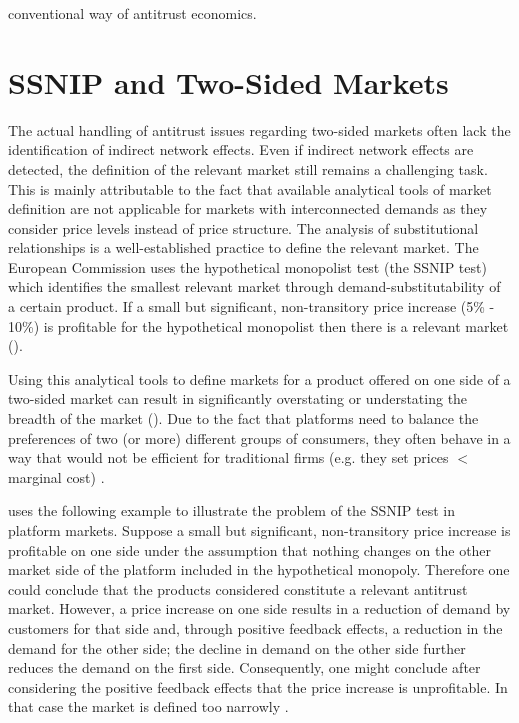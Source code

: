 \documentclass[10pt,a4paper]{scrreprt}
\begin{document}
conventional way of antitrust economics. 


\chapter{SSNIP and Two-Sided Markets}\label{SSNIP}

The actual handling of antitrust issues regarding two-sided markets often lack the identification of indirect network effects. Even if indirect network effects are detected, the definition of the relevant market still remains a challenging task. This is mainly attributable to the fact that available analytical tools of market definition are not applicable for markets with interconnected demands as they consider price levels instead of price structure. The analysis of substitutional relationships is a well-established practice to define the relevant market. The European Commission uses the hypothetical monopolist test (the SSNIP test) which identifies the smallest relevant market through demand-substitutability of a certain product. If a small but significant, non-transitory price increase (5\% - 10\%) is profitable for the hypothetical monopolist then there is a relevant market (\cite{motta_competition_2004}). 

Using this analytical tools to define markets for a product offered on one side of a two-sided market can result in significantly overstating or understating the breadth of the market (\cite{evans_analysis_2008}). Due to the fact that platforms need to balance the preferences of two (or more) different groups of consumers, they often behave in a way that would not be efficient for traditional firms (e.g. they set prices $<$ marginal cost) \cite{chandra_mergers_2009}.

\cite{evans_market_2012} uses the following example to illustrate the problem of the SSNIP test in platform markets. Suppose a small but significant, non-transitory price increase is profitable on one side under the assumption that nothing changes on the other market side of the platform included in the hypothetical monopoly. Therefore one could conclude that the products considered constitute a relevant antitrust market. However, a price increase on one side results in a reduction of demand by customers for that side and, through positive feedback effects, a reduction in the demand for the other side; the decline in demand on the other side further reduces the demand on the first side. Consequently, one might conclude after considering the positive feedback effects that the price increase is unprofitable. In that case the market is defined too narrowly .
\end{document}
